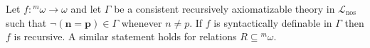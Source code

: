 Let $f: {}^m\omega \rightarrow \omega$ and let $\Gamma$ be a consistent recursively axiomatizable theory in $\mathcal{L}_{\text{nos}}$ such that $\neg(\mathbf{n} = \mathbf{p}) \in \Gamma$ whenever $n \neq p$. If $f$ is syntactically definable in $\Gamma$ then $f$ is recursive. A similar statement holds for relations $R \subseteq {}^m\omega$.

